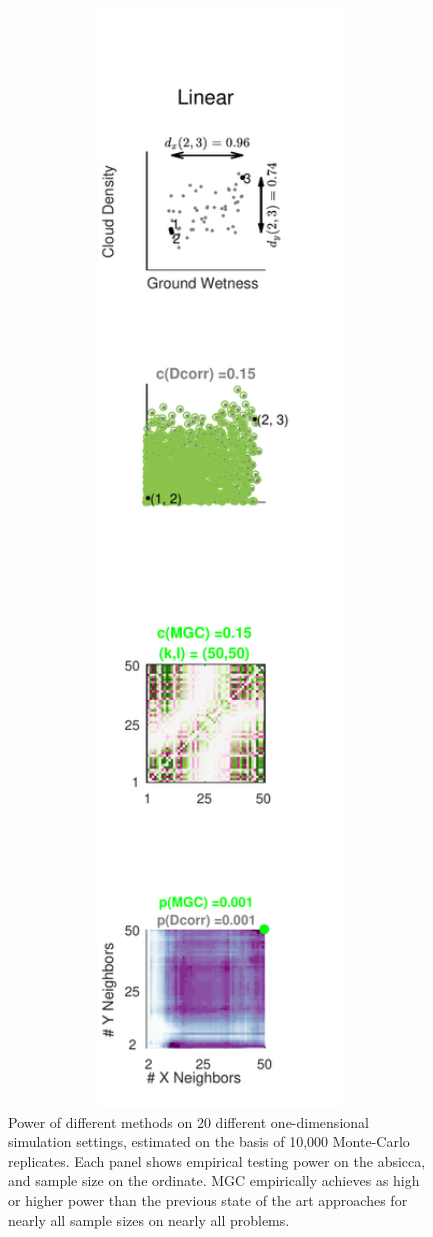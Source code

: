 \documentclass[11pt]{article}
\begin{document}
\begin{figure}[htbp]
\includegraphics[width=1.0\textwidth]{../Figures/Fig1}
\caption{
Power of different methods on 20 different one-dimensional simulation settings, estimated on the basis of 10,000 Monte-Carlo replicates.
Each panel shows empirical testing power on the absicca, and sample size on the ordinate.
MGC empirically achieves as high or higher power than the previous state of the art approaches for nearly all sample sizes on nearly all problems.}
\label{fig:1D}
\end{figure}
\end{document}

